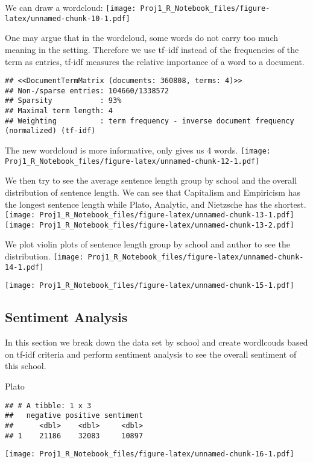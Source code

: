\documentclass[
]{article}
\begin{document}
We can draw a wordcloud:
\texttt{[image: Proj1\_R\_Notebook\_files/figure-latex/unnamed-chunk-10-1.pdf]}

One may argue that in the wordcloud, some words do not carry too much
meaning in the setting. Therefore we use tf--idf instead of the
frequencies of the term as entries, tf-idf measures the relative
importance of a word to a document.

\begin{verbatim}
## <<DocumentTermMatrix (documents: 360808, terms: 4)>>
## Non-/sparse entries: 104660/1338572
## Sparsity           : 93%
## Maximal term length: 4
## Weighting          : term frequency - inverse document frequency (normalized) (tf-idf)
\end{verbatim}

The new wordcloud is more informative, only gives us 4 words.
\texttt{[image: Proj1\_R\_Notebook\_files/figure-latex/unnamed-chunk-12-1.pdf]}

We then try to see the average sentence length group by school and the
overall distribution of sentence length. We can see that Capitalism and
Empiricism has the longest sentence length while Plato, Analytic, and
Nietzsche has the shortest.
\texttt{[image: Proj1\_R\_Notebook\_files/figure-latex/unnamed-chunk-13-1.pdf]}
\texttt{[image: Proj1\_R\_Notebook\_files/figure-latex/unnamed-chunk-13-2.pdf]}

We plot violin plots of sentence length group by school and author to
see the distribution.
\texttt{[image: Proj1\_R\_Notebook\_files/figure-latex/unnamed-chunk-14-1.pdf]}

\texttt{[image: Proj1\_R\_Notebook\_files/figure-latex/unnamed-chunk-15-1.pdf]}

\hypertarget{sentiment-analysis}{%
\subsection{Sentiment Analysis}\label{sentiment-analysis}}

In this section we break down the data set by school and create
wordlcouds based on tf-idf criteria and perform sentiment analysis to
see the overall sentiment of this school.

Plato

\begin{verbatim}
## # A tibble: 1 x 3
##   negative positive sentiment
##      <dbl>    <dbl>     <dbl>
## 1    21186    32083     10897
\end{verbatim}

\texttt{[image: Proj1\_R\_Notebook\_files/figure-latex/unnamed-chunk-16-1.pdf]}
\end{document}
